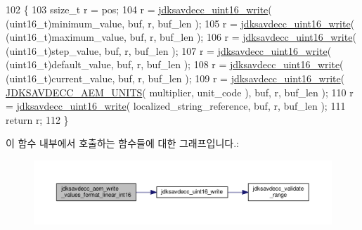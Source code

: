 \begin{DoxyCode}
102 \{
103     ssize\_t r = pos;
104     r = \hyperlink{group__endian_ga4c0851ce17bde5306fdb04bfb5b75af1}{jdksavdecc\_uint16\_write}( (uint16\_t)minimum\_value, buf, r, buf\_len );
105     r = \hyperlink{group__endian_ga4c0851ce17bde5306fdb04bfb5b75af1}{jdksavdecc\_uint16\_write}( (uint16\_t)maximum\_value, buf, r, buf\_len );
106     r = \hyperlink{group__endian_ga4c0851ce17bde5306fdb04bfb5b75af1}{jdksavdecc\_uint16\_write}( (uint16\_t)step\_value, buf, r, buf\_len );
107     r = \hyperlink{group__endian_ga4c0851ce17bde5306fdb04bfb5b75af1}{jdksavdecc\_uint16\_write}( (uint16\_t)default\_value, buf, r, buf\_len );
108     r = \hyperlink{group__endian_ga4c0851ce17bde5306fdb04bfb5b75af1}{jdksavdecc\_uint16\_write}( (uint16\_t)current\_value, buf, r, buf\_len );
109     r = \hyperlink{group__endian_ga4c0851ce17bde5306fdb04bfb5b75af1}{jdksavdecc\_uint16\_write}( \hyperlink{group__aem__descriptor_gae5f7498f6048b4dda1aca923b0eae0f6}{JDKSAVDECC\_AEM\_UNITS}( 
      multiplier, unit\_code ), buf, r, buf\_len );
110     r = \hyperlink{group__endian_ga4c0851ce17bde5306fdb04bfb5b75af1}{jdksavdecc\_uint16\_write}( localized\_string\_reference, buf, r, buf\_len );
111     \textcolor{keywordflow}{return} r;
112 \}
\end{DoxyCode}


이 함수 내부에서 호출하는 함수들에 대한 그래프입니다.\+:
\nopagebreak
\begin{figure}[H]
\begin{center}
\leavevmode
\includegraphics[width=350pt]{group__aem__descriptor_ga7e2e5a76753d02b951e9b2be5a9f4229_cgraph}
\end{center}
\end{figure}


